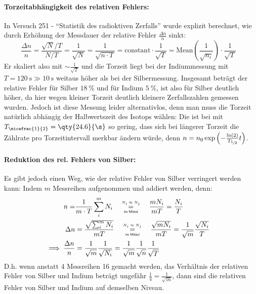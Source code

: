 \paragraph{Torzeitabhängigkeit des relativen Fehlers:} In Versuch 251 - \enquote{Statistik des radioktiven Zerfalls} wurde explizit berechnet, wie durch Erhöhung der Messdauer der relative Fehler \(\frac{\Delta n}{n}\) sinkt:
\begin{equation}
    \frac{\Delta n}{n}=\frac{\sqrt{N}/T}{N/T}=\frac{1}{\sqrt{N}}=\frac{1}{\sqrt{n\cdot T}}=\mathrm{constant}\cdot\frac{1}{\sqrt{T}}=\mathrm{Mean}\left(\frac{1}{\sqrt{n_i}}\right)\cdot\frac{1}{\sqrt{T}}
\end{equation}
Er skaliert also mit \(\sim\frac{1}{\sqrt{T}}\) und die Torzeit liegt bei der Indiummessung mit \(T=\qty{120}{\s}\gg\qty{10}{\s}\) weitaus höher als bei der Silbermessung. Insgesamt beträgt der relative Fehler für Silber \(\qty{18}{\percent}\) und für Indium \(\qty{5}{\percent}\), ist also für Silber deutlich höher, da hier wegen kleiner Torzeit deutlich kleinere Zerfallszahlen gemessen wurden. Jedoch ist diese Messung leider alternativlos, denn man muss die Torzeit natürlich abhängig der Halbwertszeit des Isotops wählen: Die ist bei  mit \(T_{\nicefrac{1}{2}}=\qty{24.6}{\s}\) so gering, dass sich bei längerer Torzeit die Zählrate pro Torzeitintervall merkbar ändern würde, denn \(n=n_0\exp\left(-\frac{\ln(2)}{T_{\nicefrac{1}{2}}} t\right)\). 

\paragraph{Reduktion des rel. Fehlers von Silber:} Es gibt jedoch einen Weg, wie der relative Fehler von Silber verringert werden kann: Indem \(m\) Messreihen aufgenommen und addiert werden, denn: 
\begin{align}
    n=&\frac{1}{m\cdot T}\sum_i^m N_i\quad\mathrel{ \overset{\mbox{\normalfont\tiny\sffamily \(N_i\approx N_j\)}}{ \underset{\mbox{\normalfont\tiny\sffamily im Mittel}}{=} } }\quad \frac{m N_i}{mT}=\frac{N_i}{T}\\
    \Delta n&=\frac{\sqrt{\sum_i^m N_i}}{mT}\quad\mathrel{ \overset{\mbox{\normalfont\tiny\sffamily \(N_i\approx N_j\)}}{ \underset{\mbox{\normalfont\tiny\sffamily im Mittel}}{=} } }\quad \frac{\sqrt{mN_i}}{mT}=\frac{1}{\sqrt{m}}\frac{\sqrt{N_i}}{T}\\
    \implies \frac{\Delta n}{n}&=\frac{1}{\sqrt{m}}\frac{1}{\sqrt{N_i}}=\frac{1}{\sqrt{m}}\frac{1}{\sqrt{n}}\frac{1}{\sqrt{T}}
\end{align}
D.h. wenn anstatt 4 Messreihen 16 gemacht werden, das Verhältnis der relativen Fehler von Silber und Indium beträgt ungefähr \(\frac{1}{4}=\frac{1}{\sqrt{16}}\), dann sind die relativen Fehler von Silber und Indium auf demselben Niveau.

